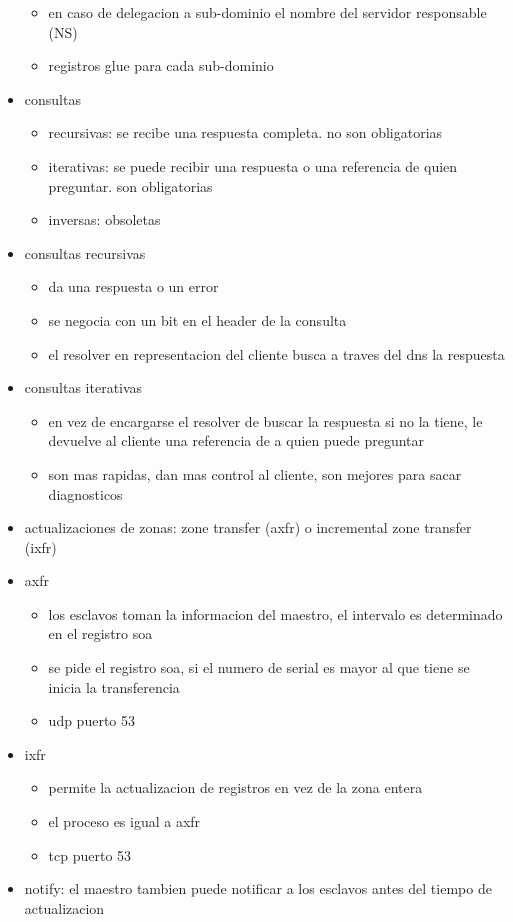 \documentclass[11pt]{article}
\begin{document}
\begin{itemize}
\begin{itemize}
\item en caso de delegacion a sub-dominio el nombre del servidor responsable (NS)
\item registros glue para cada sub-dominio
\end{itemize}
\item consultas
\begin{itemize}
\item recursivas: se recibe una respuesta completa. no son obligatorias
\item iterativas: se puede recibir una respuesta o una referencia de quien preguntar. son obligatorias
\item inversas: obsoletas
\end{itemize}
\item consultas recursivas
\begin{itemize}
\item da una respuesta o un error
\item se negocia con un bit en el header de la consulta
\item el resolver en representacion del cliente busca a traves del dns la respuesta
\end{itemize}
\item consultas iterativas
\begin{itemize}
\item en vez de encargarse el resolver de buscar la respuesta si no la tiene, le devuelve al cliente una referencia de a quien puede preguntar
\item son mas rapidas, dan mas control al cliente, son mejores para sacar diagnosticos
\end{itemize}
\item actualizaciones de zonas: zone transfer (axfr) o incremental zone transfer (ixfr)
\item axfr
\begin{itemize}
\item los esclavos toman la informacion del maestro, el intervalo es determinado en el registro soa
\item se pide el registro soa, si el numero de serial es mayor al que tiene se inicia la transferencia
\item udp puerto 53
\end{itemize}
\item ixfr
\begin{itemize}
\item permite la actualizacion de registros en vez de la zona entera
\item el proceso es igual a axfr
\item tcp puerto 53
\end{itemize}
\item notify: el maestro tambien puede notificar a los esclavos antes del tiempo de actualizacion
\end{itemize}
\end{document}
